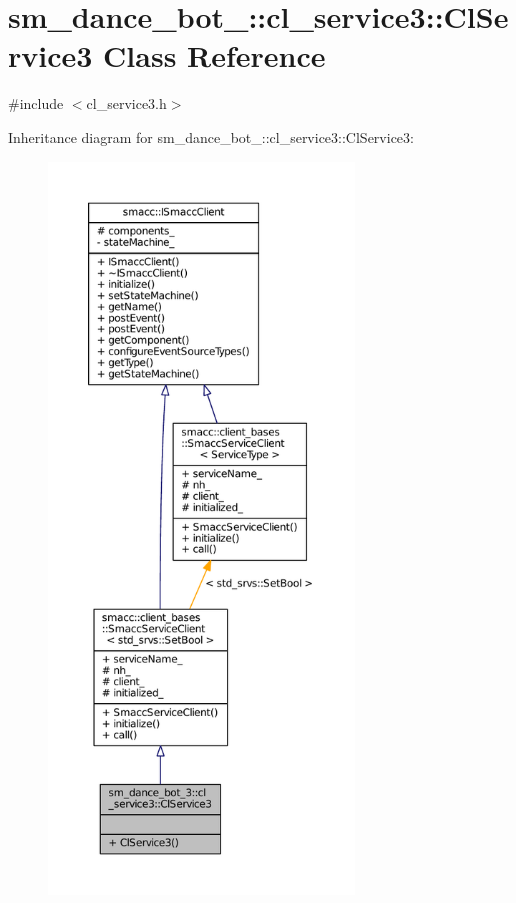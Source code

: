 \hypertarget{classsm__dance__bot__3_1_1cl__service3_1_1ClService3}{}\section{sm\+\_\+dance\+\_\+bot\+\_\+:\+:cl\+\_\+service3\+:\+:Cl\+Service3 Class Reference}
\label{classsm__dance__bot__3_1_1cl__service3_1_1ClService3}


{\ttfamily \#include $<$cl\+\_\+service3.\+h$>$}



Inheritance diagram for sm\+\_\+dance\+\_\+bot\+\_\+:\+:cl\+\_\+service3\+:\+:Cl\+Service3\+:
\nopagebreak
\begin{figure}[H]
\begin{center}
\leavevmode
\includegraphics[height=550pt]{classsm__dance__bot__3_1_1cl__service3_1_1ClService3__inherit__graph}
\end{center}
\end{figure}


